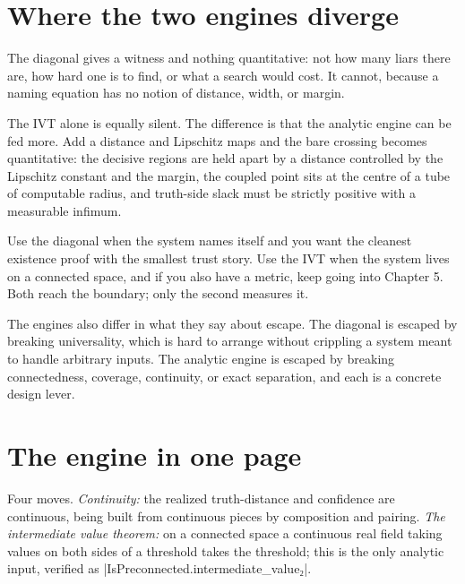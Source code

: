 \documentclass{memoir}
\begin{document}
\section{Where the two engines diverge}\label{Two--Schemas--of--Impossibility-005F-005F-005F--Machine--Checked--Limits--of--Trustworthy--Machine--Learning-005F-005F-005F--and--Why--They--Tighten--with--Capability----From--Logic--to--Analysis----Where--the--two--engines--diverge}

The diagonal gives a witness and nothing quantitative: not how many liars there
are, how hard one is to find, or what a search would cost. It cannot, because a
naming equation has no notion of distance, width, or margin.

The IVT alone is equally silent. The difference is that the analytic engine can
be fed more. Add a distance and Lipschitz maps and the bare crossing becomes
quantitative: the decisive regions are held apart by a distance controlled by
the Lipschitz constant and the margin, the coupled point sits at the centre of a
tube of computable radius, and truth-side slack must be strictly positive with a
measurable infimum.

Use the diagonal when the system names itself and you want the cleanest
existence proof with the smallest trust story. Use the IVT when the system lives
on a connected space, and if you also have a metric, keep going into Chapter 5.
Both reach the boundary; only the second measures it.

The engines also differ in what they say about escape. The diagonal is escaped
by breaking universality, which is hard to arrange without crippling a system
meant to handle arbitrary inputs. The analytic engine is escaped by breaking
connectedness, coverage, continuity, or exact separation, and each is a concrete
design lever.



\section{The engine in one page}\label{Two--Schemas--of--Impossibility-005F-005F-005F--Machine--Checked--Limits--of--Trustworthy--Machine--Learning-005F-005F-005F--and--Why--They--Tighten--with--Capability----From--Logic--to--Analysis----The--engine--in--one--page}

Four moves. \emph{Continuity:} the realized truth-distance and confidence are
continuous, being built from continuous pieces by composition and pairing. \emph{The
intermediate value theorem:} on a connected space a continuous real field taking
values on both sides of a threshold takes the threshold; this is the only
analytic input, verified as \LeanVerb|IsPreconnected.intermediate_value₂|.
\end{document}
